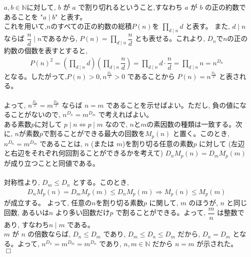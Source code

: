 $a,b\in\mathbb{N}$に対して, $b$ が $a$ で割り切れるということ,すなわち $a$ が $b$ の正の約数であることを "$a\mid b$" と表す。\\
これを用いて,$n$のすべての正の約数の総積$P(n)$を $\displaystyle\prod_{d\mid n}d$ と表す。 また, $d\mid n$ならば $\dfrac{n}{d}\mid n$であるから, $P(n)=\displaystyle\prod_{d\mid n}\dfrac{n}{d}$ とも表せる。これより, $D_n$で$n$の正の約数の個数を表すとすると,
\begin{eqnarray*}
P(n)^2 = \left(\displaystyle\prod_{d\mid n}d\right)\left(\displaystyle\prod_{d\mid n}\dfrac{n}{d}\right) = \displaystyle\prod_{d\mid n}d\cdot \dfrac{n}{d} = \displaystyle\prod_{d\mid n}n = n^{D_n}
\end{eqnarray*}
となる。したがって,$P(n)>0, n^{\frac{D_n}{2}}>0$ であることから $P(n)=n^{\frac{D_n}{2}}$ と表される。\\
\\
よって, $n^{\frac{D_n}{2}}=m^{\frac{D_m}{2}}$ ならば $n=m$ であることを示せばよい。ただし, 負の値になることがないので, $n^{D_n}=m^{D_m}$ で考えればよい。\\
ある素数$p$に対して $p\mid n\Leftrightarrow p\mid m$ なので, $n$と$m$の素因数の種類は一致する。次に, $n$が素数$p$で割ることができる最大の回数を$M_p(n)$ と置く。このとき, $n^{D_n}=m^{D_m}$ であることは, $n$ (または $m$)を割り切る任意の素数$p$ に対して (左辺と右辺をそれぞれ何回割ることができるかを考えて) $D_nM_p(n)=D_mM_p(m)$ が成り立つことと同値である。\\
\\
対称性より, $D_m\le D_n$ とする。このとき,
\begin{eqnarray*} 
D_nM_p(n)=D_mM_p(m)\le D_nM_p(m) \Rightarrow M_p(n)\le M_p(m)
\end{eqnarray*}
が成立する。 よって, 任意の$n$を割り切る素数$p$ に関して, $m$ のほうが, $n$ と同じ回数, あるいは$n$ より多い回数だけ$p$ で割ることができる。よって, $\dfrac{m}{n}$ は整数であり, すなわち$n\mid m$ である。\\
$m$ が $n$ の倍数ならば,  $D_n\le D_m$ であり, $D_m\le D_n\le D_m$ だから, $D_n=D_m$ となる。よって, $n^{D_n}=m^{D_m}=m^{D_n}$ であり, $n,m\in\mathbb{N}$ だから $n=m$ が示された。　　$\Box$
